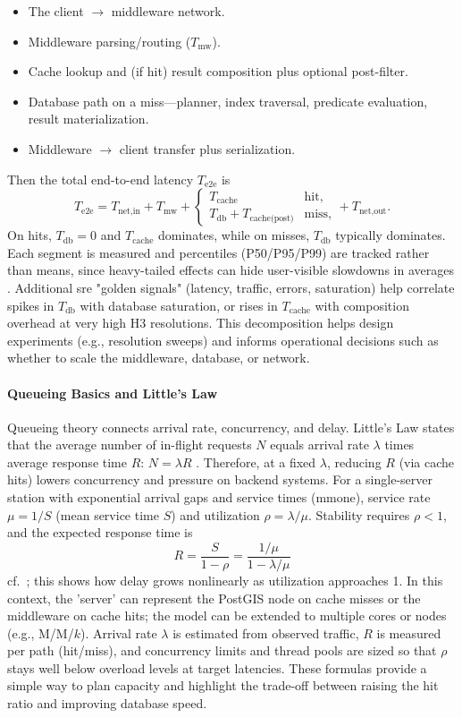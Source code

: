 \begin{itemize}
  \item The client $\rightarrow$ middleware network.
  \item Middleware parsing/routing ($T_{\text{mw}}$).
  \item Cache lookup and (if hit) result composition plus optional post-filter.
  \item Database path on a miss---planner, index traversal, predicate evaluation, result materialization.
  \item Middleware $\rightarrow$ client transfer plus serialization.
\end{itemize}

Then the total end-to-end latency $T_{\text{e2e}}$ is
\[
T_{\text{e2e}}=
T_{\text{net,in}}+T_{\text{mw}}+\begin{cases}
T_{\text{cache}} & \text{hit},\\
T_{\text{db}}+T_{\text{cache(post)}} & \text{miss},
\end{cases}
+T_{\text{net,out}}.
\]
On hits, $T_{\text{db}}=0$ and $T_{\text{cache}}$ dominates, while on misses, $T_{\text{db}}$ typically dominates. Each segment is measured and percentiles (P50/P95/P99) are tracked rather than means, since heavy-tailed effects can hide user-visible slowdowns in averages \cite{Dean_2013}. Additional \ac{sre} "golden signals" (latency, traffic, errors, saturation) help correlate spikes \cite{GoogleSRE_Monitoring} in $T_{\text{db}}$ with database saturation, or rises in $T_{\text{cache}}$ with composition overhead at very high H3 resolutions. This decomposition helps design experiments (e.g., resolution sweeps) and informs operational decisions such as whether to scale the middleware, database, or network.

\paragraph{Queueing Basics and Little’s Law}
Queueing theory connects arrival rate, concurrency, and delay. Little's Law states that the average number of in-flight requests $N$ equals arrival rate $\lambda$ times average response time $R$: $N=\lambda R$ \cite{Little_1961}. Therefore, at a fixed $\lambda$, reducing $R$ (via cache hits) lowers concurrency and pressure on backend systems. For a single-server station with exponential arrival gaps and service times (\ac{mmone}), service rate $\mu=1/S$ (mean service time $S$) and utilization $\rho=\lambda/\mu$. Stability requires $\rho<1$, and the expected response time is
\[
  R=\frac{S}{1-\rho}=\frac{1/\mu}{1-\lambda/\mu}
\]
cf.\ \cite{Myers_MM1_Queue}; this shows how delay grows nonlinearly as utilization approaches 1. In this context, the 'server' can represent the PostGIS node on cache misses or the middleware on cache hits; the model can be extended to multiple cores or nodes (e.g., M/M/$k$). Arrival rate $\lambda$ is estimated from observed traffic, $R$ is measured per path (hit/miss), and concurrency limits and thread pools are sized so that $\rho$ stays well below overload levels at target latencies. These formulas provide a simple way to plan capacity and highlight the trade-off between raising the hit ratio and improving database speed.

